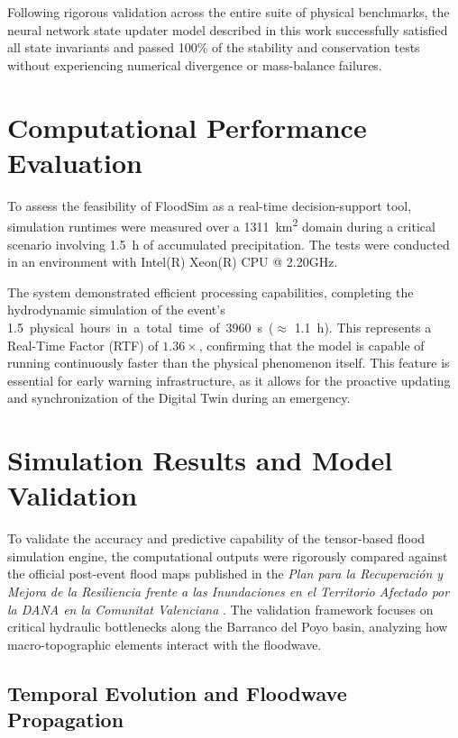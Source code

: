 Following rigorous validation across the entire suite of physical benchmarks, the neural network state updater model described in this 
work successfully satisfied all state invariants and passed 100\% of the stability and conservation tests without experiencing numerical 
divergence or mass-balance failures.


\section{Computational Performance Evaluation}

To assess the feasibility of FloodSim as a real-time decision-support tool, simulation runtimes were measured over a \SI{1311}{\km\squared} 
domain during a critical scenario involving \SI{1.5}{\hour} of accumulated precipitation. The tests were conducted in an environment with 
Intel(R) Xeon(R) CPU @ 2.20GHz.

The system demonstrated efficient processing capabilities, completing the hydrodynamic simulation of the event’s \SI{1.5} physical hours 
in a total time of \SI{3960}{\second} ($\approx$ \SI{1.1}{\hour}). This represents a Real-Time Factor (RTF) of $1.36\times$, confirming 
that the model is capable of running continuously faster than the physical phenomenon itself. This feature is essential for early warning 
infrastructure, as it allows for the proactive updating and synchronization of the Digital Twin during an emergency.


\section{Simulation Results and Model Validation}
\label{section:simulation_results_and_model_validation}

To validate the accuracy and predictive capability of the tensor-based flood simulation engine, the computational outputs were rigorously 
compared against the official post-event flood maps published in the \textit{Plan para la Recuperación y Mejora de la Resiliencia frente a 
las Inundaciones en el Territorio Afectado por la DANA en la Comunitat Valenciana} \cite{DEMARCACIONHIDROGRAFICADELJUCAR2025}. The validation 
framework focuses on critical hydraulic bottlenecks along the Barranco del Poyo basin, analyzing how macro-topographic elements interact 
with the floodwave.


\subsection{Temporal Evolution and Floodwave Propagation}
\label{subsection:temporal_evolution}

